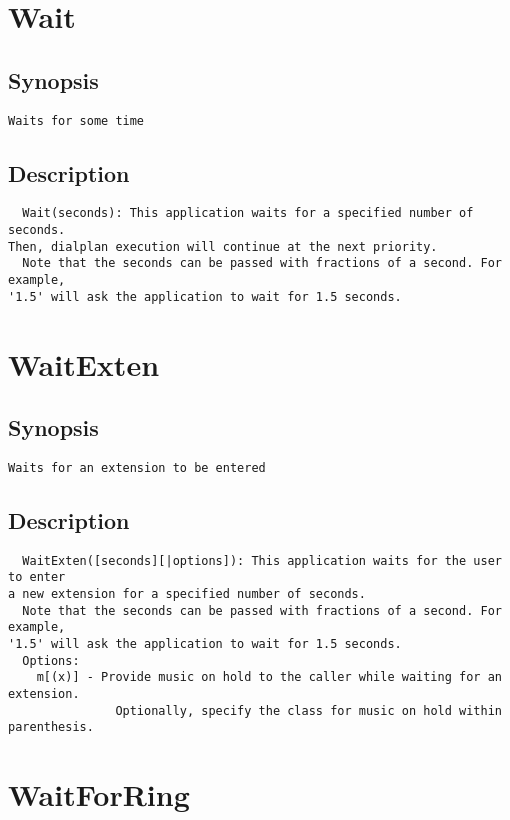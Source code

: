 \section{Wait}
\subsection{Synopsis}
\begin{verbatim}
Waits for some time
\end{verbatim}
\subsection{Description}
\begin{verbatim}
  Wait(seconds): This application waits for a specified number of seconds.
Then, dialplan execution will continue at the next priority.
  Note that the seconds can be passed with fractions of a second. For example,
'1.5' will ask the application to wait for 1.5 seconds.

\end{verbatim}


\section{WaitExten}
\subsection{Synopsis}
\begin{verbatim}
Waits for an extension to be entered
\end{verbatim}
\subsection{Description}
\begin{verbatim}
  WaitExten([seconds][|options]): This application waits for the user to enter
a new extension for a specified number of seconds.
  Note that the seconds can be passed with fractions of a second. For example,
'1.5' will ask the application to wait for 1.5 seconds.
  Options:
    m[(x)] - Provide music on hold to the caller while waiting for an extension.
               Optionally, specify the class for music on hold within parenthesis.

\end{verbatim}


\section{WaitForRing}

